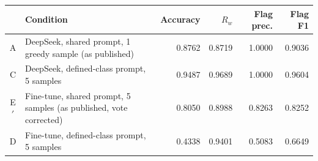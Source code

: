 \begin{tabular}{@{}cp{6.6cm}rrrr@{}}
\toprule
 & Condition & Accuracy & $R_w$ & Flag prec. & Flag F1 \\
\midrule
A & DeepSeek, shared prompt, 1 greedy sample (as published) & 0.8762 & 0.8719 & 1.0000 & 0.9036 \\
C & DeepSeek, defined-class prompt, 5 samples & 0.9487 & 0.9689 & 1.0000 & 0.9604 \\
E$'$ & Fine-tune, shared prompt, 5 samples (as published, vote corrected) & 0.8050 & 0.8988 & 0.8263 & 0.8252 \\
D & Fine-tune, defined-class prompt, 5 samples & 0.4338 & 0.9401 & 0.5083 & 0.6649 \\
\bottomrule
\end{tabular}
